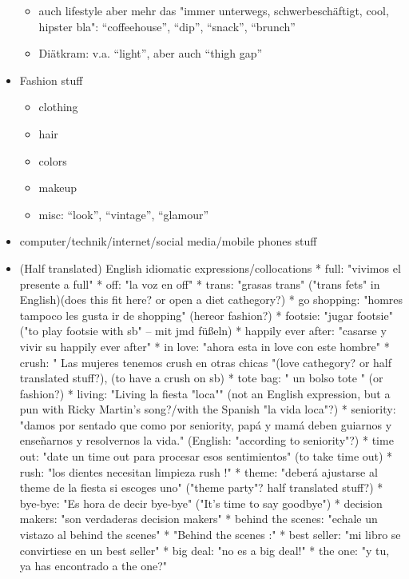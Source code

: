 \begin{itemize}
\begin{itemize}
      \item auch lifestyle aber mehr das "immer unterwegs, schwerbeschäftigt, cool, hipster bla": ``coffeehouse'', ``dip'', ``snack'', ``brunch''
      \item Diätkram: v.a. ``light'', aber auch ``thigh gap''
    \end{itemize}
  \item Fashion stuff
    \begin{itemize}
      \item clothing
      \item hair
      \item colors
      \item makeup
      \item misc: ``look'', ``vintage'', ``glamour''
    \end{itemize}
  \item computer/technik/internet/social media/mobile phones stuff
  \item (Half translated) English idiomatic expressions/collocations
    * full: "vivimos el presente a full"
    * off: "la voz en off"
    * trans: "grasas trans" ("trans fets" in English)(does this fit here? or open a diet cathegory?)
    * go shopping: "homres tampoco les gusta ir de shopping" (hereor fashion?)
    * footsie: "jugar footsie" ("to play footsie with sb" -- mit jmd füßeln)
    * happily ever after: "casarse y vivir su happily ever after"
    * in love: "ahora esta in love con este hombre"
    * crush: " Las mujeres tenemos crush en otras chicas "(love cathegory? or half translated stuff?), (to have a crush on sb)
    * tote bag: " un bolso tote " (or fashion?)
    * living: "Living la fiesta "loca"" (not an English expression, but a pun with Ricky Martin's song?/with the Spanish "la vida loca"?)
    * seniority: "damos por sentado que como por seniority, papá y mamá deben guiarnos y enseñarnos y resolvernos la vida."  (English: "according to seniority"?)
    * time out: "date un time out para procesar esos sentimientos"  (to take time out)
    * rush: "los dientes necesitan limpieza rush !"
    * theme: "deberá ajustarse al theme de la fiesta si escoges uno" ("theme party"? half translated stuff?)
    * bye-bye: "Es hora de decir bye-bye" ("It's time to say goodbye")
    * decision makers: "son verdaderas decision makers"
    * behind the scenes: "echale un vistazo al behind the scenes"
    * "Behind the scenes :"
    * best seller: "mi libro se convirtiese en un best seller"
    * big deal: "no es a big deal!"
    * the one: "y tu, ya has encontrado a the one?"

\end{itemize}
